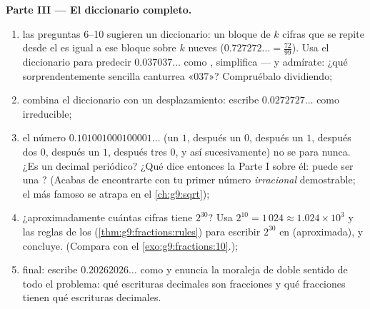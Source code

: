 \begin{problem}
\medskip
\noindent\textbf{Parte III --- El diccionario completo.}
\begin{enumerate}[resume]
  \item las preguntas 6--10 sugieren un diccionario: un bloque de $k$
        cifras que se repite desde el  es igual a ese bloque
        sobre $k$ nueves ($0.727272\ldots = \frac{72}{99}$). Usa
        el diccionario para predecir $0.037037\ldots$ como ,
        simplifica --- y admírate: ¿qué  sorprendentemente
        sencilla canturrea «$037$»? Compruébalo dividiendo;
  \item combina el diccionario con un desplazamiento: escribe
        $0.0272727\ldots$ como  irreducible;
  \item el número $0.101001000100001\ldots$ (un $1$, después un
        $0$, después un $1$, después dos $0$, después un $1$, después tres
        $0$, y así sucesivamente) no se para nunca. ¿Es un decimal periódico?
        ¿Qué dice entonces la Parte I sobre él: puede ser una
        ? (Acabas de encontrarte con tu primer número
        \emph{irracional} demostrable; el más famoso se atrapa
        en el \cref{ch:g9:sqrt});
  \item ¿aproximadamente cuántas cifras tiene $2^{30}$? Usa
        $2^{10} = 1\,024 \approx 1.024 \times 10^3$ y las
        reglas de los  (\cref{thm:g9:fractions:rules}) para escribir
        $2^{30}$ en  (aproximada), y
        concluye. (Compara con el \cref{exo:g9:fractions:10}.);
  \item final: escribe $0.20262026\ldots$ como  y
        enuncia la moraleja de doble sentido de todo el problema: qué
        escrituras decimales son fracciones y qué fracciones tienen
        qué escrituras decimales.
\end{enumerate}
\end{problem}
